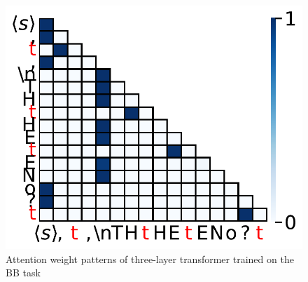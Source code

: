 \begin{figure}[h]
\begin{minipage}{0.3\textwidth}
  \end{minipage}
  \begin{minipage}{0.3\textwidth}
      \centering
      \vspace{-.2em}
      \includegraphics[width=\linewidth]{Figures/BBM_appendix/massive_attn_step10k_fig2.pdf}
  \end{minipage}
  \caption{\small Attention weight patterns of three-layer transformer trained on the BB task}
  \label{appfigure:massive-attn}
  \vspace{-1em}
\end{figure}

